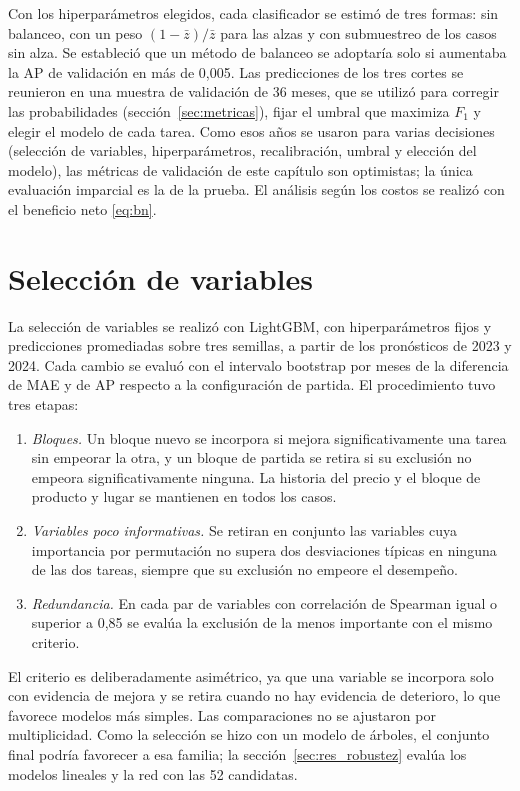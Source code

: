 Con los hiperparámetros elegidos, cada clasificador se estimó de tres formas: sin balanceo, con un peso $(1-\bar z)/\bar z$ para las alzas y con submuestreo de los casos sin alza. Se estableció que un método de balanceo se adoptaría solo si aumentaba la AP de validación en más de 0,005. Las predicciones de los tres cortes se reunieron en una muestra de validación de 36 meses, que se utilizó para corregir las probabilidades (sección~\ref{sec:metricas}), fijar el umbral que maximiza $F_1$ y elegir el modelo de cada tarea. Como esos años se usaron para varias decisiones (selección de variables, hiperparámetros, recalibración, umbral y elección del modelo), las métricas de validación de este capítulo son optimistas; la única evaluación imparcial es la de la prueba. El análisis según los costos se realizó con el beneficio neto \eqref{eq:bn}.


\FloatBarrier
\section{Selección de variables}
\label{sec:seleccion}

La selección de variables se realizó con LightGBM, con hiperparámetros fijos y predicciones promediadas sobre tres semillas, a partir de los pronósticos de 2023 y 2024. Cada cambio se evaluó con el intervalo bootstrap por meses de la diferencia de MAE y de AP respecto a la configuración de partida. El procedimiento tuvo tres etapas:
\begin{enumerate}[nosep]
\item \emph{Bloques.} Un bloque nuevo se incorpora si mejora significativamente una tarea sin empeorar la otra, y un bloque de partida se retira si su exclusión no empeora significativamente ninguna. La historia del precio y el bloque de producto y lugar se mantienen en todos los casos.
\item \emph{Variables poco informativas.} Se retiran en conjunto las variables cuya importancia por permutación no supera dos desviaciones típicas en ninguna de las dos tareas, siempre que su exclusión no empeore el desempeño.
\item \emph{Redundancia.} En cada par de variables con correlación de Spearman igual o superior a 0,85 se evalúa la exclusión de la menos importante con el mismo criterio.
\end{enumerate}
El criterio es deliberadamente asimétrico, ya que una variable se incorpora solo con evidencia de mejora y se retira cuando no hay evidencia de deterioro, lo que favorece modelos más simples. Las comparaciones no se ajustaron por multiplicidad. Como la selección se hizo con un modelo de árboles, el conjunto final podría favorecer a esa familia; la sección~\ref{sec:res_robustez} evalúa los modelos lineales y la red con las 52 candidatas.

